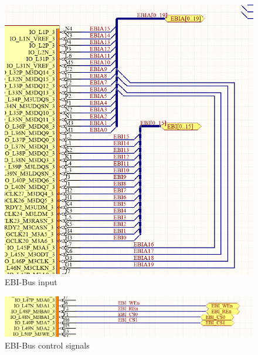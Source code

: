 \begin{figure}
    \includegraphics[width=\linewidth]{img/EBI-bus.png}
    \caption{EBI-Bus input}
    \label{fig:EbiBus}
\end{figure}

\begin{figure}
    \includegraphics[width=\linewidth]{img/EBI-bus_2.png}
    \caption{EBI-Bus control signals}
    \label{fig:EbiControl}
\end{figure}

